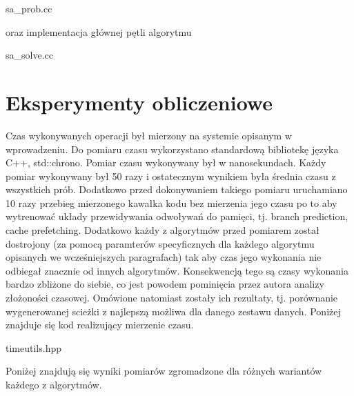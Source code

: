 \documentclass[polish,polish,a4paper]{article}
\begin{document}

{sa_prob.cc}

oraz implementacja głównej pętli algorytmu


{sa_solve.cc}

\pagebreak
\section{Eksperymenty obliczeniowe}
Czas wykonywanych operacji był mierzony na systemie opisanym w wprowadzeniu.
Do pomiaru czasu wykorzystano standardową bibliotekę języka C++, std::chrono.
Pomiar czasu wykonywany był w nanosekundach. Każdy pomiar wykonywany był 50 razy i ostatecznym wynikiem była średnia czasu z wszystkich prób.
Dodatkowo przed dokonywaniem takiego pomiaru uruchamiano 10 razy przebieg mierzonego kawałka kodu bez mierzenia jego czasu po to aby wytrenować układy przewidywania odwoływań do pamięci,
tj. branch prediction, cache prefetching.
Dodatkowo każdy z algorytmów przed pomiarem został dostrojony (za pomocą paramterów specyficznych dla każdego algorytmu opisanych we wcześniejszych
paragrafach) tak aby czas jego wykonania nie odbiegał znacznie od innych algorytmów. Konsekwencją tego są czasy wykonania bardzo zbliżone do siebie,
co jest powodem pominięcia przez autora analizy złożoności czasowej. Omówione natomiast zostały ich rezultaty, tj. porównanie wygenerowanej
scieżki z najlepszą możliwa dla danego zestawu danych.
Poniżej znajduje się kod realizujący mierzenie czasu.


{timeutils.hpp}

\par
Poniżej znajdują się wyniki pomiarów zgromadzone dla różnych wariantów każdego z algorytmów.
\end{document}
